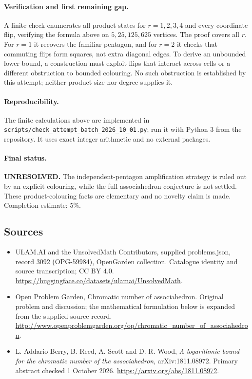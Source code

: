 \documentclass[11pt,a4paper]{article}
\begin{document}
\paragraph{Verification and first remaining gap.}
A finite check enumerates all product states for $r=1,2,3,4$ and every
coordinate flip, verifying the formula above on $5,25,125,625$ vertices.
The proof covers all $r$. For $r=1$ it recovers the familiar pentagon, and
for $r=2$ it checks that commuting flips form squares, not extra diagonal
edges. To derive an unbounded lower bound, a construction must exploit flips
that interact across cells or a different obstruction to bounded colouring.
No such obstruction is established by this attempt; neither product size nor
degree supplies it.

\paragraph{Reproducibility.}
The finite calculations above are implemented in
\texttt{scripts/check\_attempt\_batch\_2026\_10\_01.py}; run it with Python 3
from the repository. It uses exact integer arithmetic and no external packages.

\paragraph{Final status.}
\textbf{UNRESOLVED.} The independent-pentagon amplification strategy is ruled
out by an explicit colouring, while the full associahedron conjecture is not
settled. These product-colouring facts are elementary and no novelty claim
is made. Completion estimate: 5\%.

\subsection{Sources}
\begin{itemize}
\item[S1] ULAM.AI and the UnsolvedMath Contributors, supplied problems.json, record 3092 (OPG-59984), OpenGarden collection. Catalogue identity and source transcription; CC BY 4.0.
\url{https://huggingface.co/datasets/ulamai/UnsolvedMath}.
\item[S2] Open Problem Garden, Chromatic number of associahedron. Original problem and discussion; the mathematical formulation below is expanded from the supplied source record.
\url{http://www.openproblemgarden.org/op/chromatic_number_of_associahedron}.
\item[A1] L. Addario-Berry, B. Reed, A. Scott and D. R. Wood, \emph{A logarithmic bound for the chromatic number of the associahedron}, arXiv:1811.08972. Primary abstract checked 1 October 2026. \url{https://arxiv.org/abs/1811.08972}.
\end{itemize}
\end{document}
